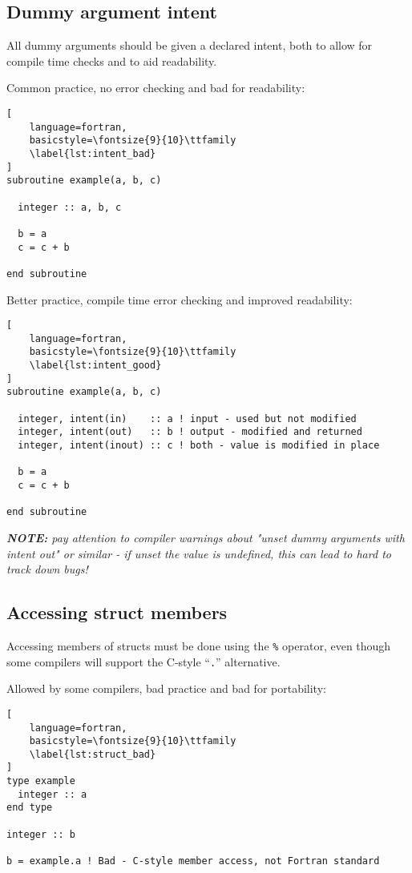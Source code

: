 \documentclass[11pt]{article}
\begin{document}
\subsection{Dummy argument intent}
All dummy arguments should be given a declared intent, both to allow for compile time checks and to aid readability.

Common practice, no error checking and bad for readability:
\begin{lstlisting}[
	language=fortran,
    basicstyle=\fontsize{9}{10}\ttfamily
    \label{lst:intent_bad}
]
subroutine example(a, b, c)

  integer :: a, b, c

  b = a
  c = c + b

end subroutine
\end{lstlisting}

Better practice, compile time error checking and improved readability:
\begin{lstlisting}[
	language=fortran,
    basicstyle=\fontsize{9}{10}\ttfamily
    \label{lst:intent_good}
]
subroutine example(a, b, c)

  integer, intent(in)    :: a ! input - used but not modified
  integer, intent(out)   :: b ! output - modified and returned
  integer, intent(inout) :: c ! both - value is modified in place
  
  b = a
  c = c + b

end subroutine
\end{lstlisting}

\textit{\textbf{NOTE:} pay attention to compiler warnings about "unset dummy arguments with intent out" or similar - if unset the value is undefined, this can lead to hard to track down bugs!}

\subsection{Accessing struct members}
Accessing members of structs must be done using the \texttt{\%} operator, even though some compilers will support 
the C-style ``\texttt{.}'' alternative.

Allowed by some compilers, bad practice and bad for portability:
\begin{lstlisting}[
	language=fortran,
    basicstyle=\fontsize{9}{10}\ttfamily
    \label{lst:struct_bad}
]
type example
  integer :: a
end type

integer :: b

b = example.a ! Bad - C-style member access, not Fortran standard
\end{lstlisting}
\end{document}
